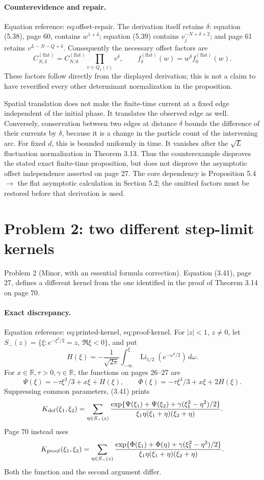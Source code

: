 \documentclass[10pt]{article}
\begin{document}
\paragraph*{Counterevidence and repair.}\mbox{}\par
Equation reference: eq:offset-repair. The derivation itself retains \(\delta\): equation (5.38), page 60, contains \(w^{1+\delta}\); equation (5.39) contains \(v_j^{-N+\delta+2}\); and page 61 retains \(v^{L-N-Q+\delta}\). Consequently the necessary offset factors are \[
 C_{N,\delta}^{(\mathrm{flat})}
 =C_{N,0}^{(\mathrm{flat})}\prod_{v\in Q_1(z)}v^\delta,
 \qquad
 f_\delta^{(\mathrm{flat})}(w)=w^\delta f_0^{(\mathrm{flat})}(w).\] These factors follow directly from the displayed derivation; this is not a claim to have reverified every other determinant normalization in the proposition.\par
Spatial translation does not make the finite-time current at a fixed edge independent of the initial phase. It translates the observed edge as well. Conversely, conservation between two edges at distance \(\delta\) bounds the difference of their currents by \(\delta\), because it is a change in the particle count of the intervening arc. For fixed \(d\), this is bounded uniformly in time. It vanishes after the \(\sqrt L\) fluctuation normalization in Theorem 3.13. Thus the counterexample disproves the stated exact finite-time proposition, but does not disprove the asymptotic offset independence asserted on page 27. The core dependency is Proposition 5.4 \(\to\) the flat asymptotic calculation in Section 5.2; the omitted factors must be restored before that derivation is used.\par
\section*{Problem 2: two different step-limit kernels}
Problem 2 (Minor, with an essential formula correction).  Equation (3.41), page 27, defines a different kernel from the one identified in the proof of Theorem 3.14 on page 70.\par
\paragraph*{Exact discrepancy.}\mbox{}\par
Equation reference: eq:printed-kernel, eq:proof-kernel. For \(|z|<1\), \(z\ne0\), let \(S_-(z)=\{\xi:e^{-\xi^2/2}=z,\ \Re\xi<0\}\), and put \[H(\xi)=-\frac1{\sqrt{2\pi}}
   \int_{-\infty}^{\xi}\operatorname{Li}_{1/2}(e^{-\omega^2/2})\,d\omega.\] For \(x\in\mathbb R,\tau>0,\gamma\in\mathbb R\), the functions on pages 26–27 are \[\Psi(\xi)=-\tau\xi^3/3+x\xi+H(\xi),\qquad
 \Phi(\xi)=-\tau\xi^3/3+x\xi+2H(\xi).\] Suppressing common parameters, (3.41) prints \[
 K_{\rm def}(\xi_1,\xi_2)
 =\sum_{\eta\in S_-(z)}
 \frac{\exp\{\Psi(\xi_1)+\Psi(\xi_2)
              +\gamma(\xi_1^2-\eta^2)/2\}}
 {\xi_1\eta(\xi_1+\eta)(\xi_2+\eta)}.\] Page 70 instead uses \[
 K_{\rm proof}(\xi_1,\xi_2)
 =\sum_{\eta\in S_-(z)}
 \frac{\exp\{\Phi(\xi_1)+\Phi(\eta)
              +\gamma(\xi_1^2-\eta^2)/2\}}
 {\xi_1\eta(\xi_1+\eta)(\xi_2+\eta)}.\] Both the function and the second argument differ.\par
\end{document}
